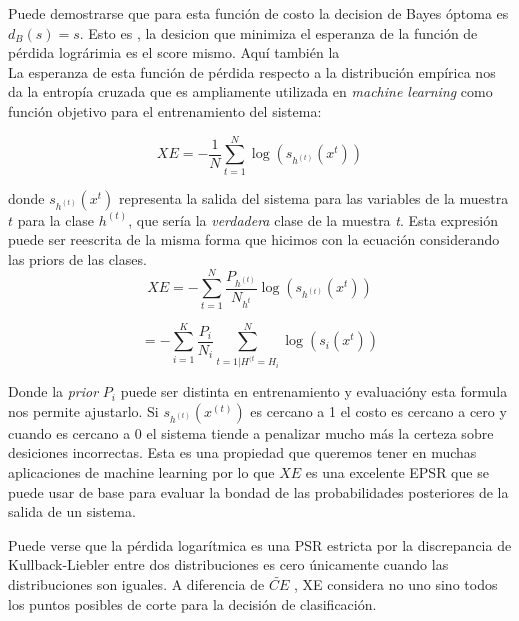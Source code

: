 \documentclass[11pt,a4paper,twoside]{tesis}
\begin{document}
Puede demostrarse que para esta función de costo la decision de Bayes óptoma es $d_B(s)=s$. Esto es , la desicion que minimiza el esperanza de la función de pérdida lográrimia es el score mismo. Aquí también la \\
La esperanza de esta función de pérdida respecto a la distribución empírica nos da la entropía cruzada que es ampliamente utilizada en \textit{machine learning} como función objetivo para el entrenamiento del sistema:

\begin{equation}
    XE = -\frac{1}{N}\sum_{t=1}^N \log(s_{h^(t)}(x^{t})) 
\end{equation}

donde $s_{h^(t)}(x^{t})$ representa la salida del sistema para las variables de la muestra $t$ para la clase $h^{(t)}$, que sería la \textit{verdadera} clase de la muestra \textit{t}. Esta expresión puede ser reescrita de la misma forma que hicimos con la ecuación considerando las priors de las clases. 
\begin{equation}
    XE = -\sum_{t=1}^N \frac{P_{h^{(t)}}}{N_{h^{t}}} \log(s_{h^(t)}(x^{t})) 
\end{equation}

\begin{equation}
    = - \sum_{i=1}^{K} \frac{P_i}{N_i} \sum_{t=1|H^{(t}=H_i}^N \log(s_{i}(x^{t})) 
\end{equation}

Donde la \textit{prior} $P_i$ puede ser distinta en entrenamiento y evaluacióny esta formula nos permite ajustarlo. 
Si $ s_{h^{(t)}}(x^{(t)})$ es cercano a 1 el costo es cercano a cero y cuando es cercano a 0 el sistema tiende a penalizar mucho más la certeza sobre desiciones incorrectas. Esta es una propiedad que queremos tener en muchas aplicaciones de machine learning por lo que $XE$ es una excelente EPSR que se puede usar de base para evaluar la bondad de las probabilidades posteriores de la salida de un sistema. 

Puede verse que la pérdida logarítmica es una PSR estricta por la discrepancia de Kullback-Liebler entre dos distribuciones es cero únicamente cuando las distribuciones son iguales. A diferencia de $\widetilde{CE}$ , XE considera no uno sino todos los puntos posibles de corte para la decisión de clasificación. 
\end{document}
